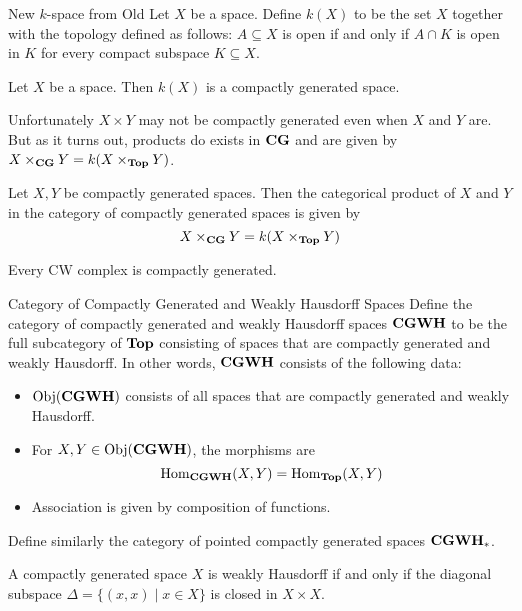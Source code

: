 \documentclass[a4paper]{article}
\begin{document}
\begin{defn}{New $k$-space from Old}{} Let $X$ be a space. Define $k(X)$ to be the set $X$ together with the topology defined as follows: $A\subseteq X$ is open if and only if $A\cap K$ is open in $K$ for every compact subspace $K\subseteq X$. 
\end{defn}

\begin{lmm}{}{} Let $X$ be a space. Then $k(X)$ is a compactly generated space. 
\end{lmm}

Unfortunately $X\times Y$ may not be compactly generated even when $X$ and $Y$ are. But as it turns out, products do exists in $\bold{CG}$ and are given by $X\times_{\bold{CG}}Y=k(X\times_{\bold{Top}} Y)$. 

\begin{prp}{}{} Let $X,Y$ be compactly generated spaces. Then the categorical product of $X$ and $Y$ in the category of compactly generated spaces is given by $$X\times_{\bold{CG}}Y=k(X\times_{\bold{Top}} Y)$$
\end{prp}

\begin{prp}{}{} Every CW complex is compactly generated. 
\end{prp}

\begin{defn}{Category of Compactly Generated and Weakly Hausdorff Spaces}{} Define the category of compactly generated and weakly Hausdorff spaces $\bold{CGWH}$ to be the full subcategory of $\bold{Top}$ consisting of spaces that are compactly generated and weakly Hausdorff. In other words, $\bold{CGWH}$ consists of the following data: 
\begin{itemize}
\item $\text{Obj}(\bold{CGWH})$ consists of all spaces that are compactly generated and weakly Hausdorff. 
\item For $X,Y\in\text{Obj}(\bold{CGWH})$, the morphisms are $$\operatorname{Hom}_{\bold{CGWH}}(X,Y)=\operatorname{Hom}_{\bold{Top}}(X,Y)$$
\item Association is given by composition of functions. 
\end{itemize}
Define similarly the category of pointed compactly generated spaces $\bold{CGWH}_\ast$. 
\end{defn}

\begin{prp}{}{} A compactly generated space $X$ is weakly Hausdorff if and only if the diagonal subspace $\Delta=\{(x,x)\;|\;x\in X\}$ is closed in $X\times X$. 
\end{prp}
\end{document}
